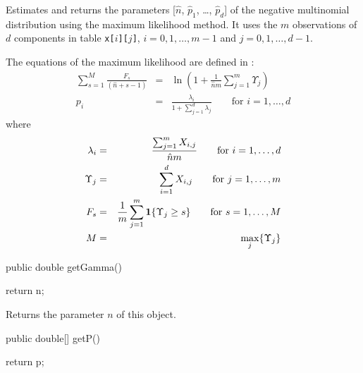 \begin{tabb}
   Estimates  and returns the parameters [$\hat{n}$, $\hat{p}_1$, \ldots,
  $\hat{p}_d$]
   of the negative multinomial distribution using the maximum likelihood method.
   It uses the $m$ observations of $d$ components in table
   \texttt{x[$i$][$j$]}, $i = 0, 1, \ldots, m-1$ and $j = 0, 1, \ldots, d-1$.
   \begin{detailed}
   The equations of the maximum likelihood are defined in \cite{tJOH69a}:
   \begin{eqnarray*}
      \sum_{s=1}^{M} \frac{F_s}{(\hat{n} + s - 1)} & = & \ln \left(1 +
        \frac{1}{\hat{n} m} \sum_{j=1}^{m} \Upsilon_j \right)\\[8pt]
      p_i & = & \frac{\lambda_i}{1 + \sum_{j=1}^{d} \lambda_j}
                 \qquad \mbox{for } i=1, \ldots,d
   \end{eqnarray*}
   where
   \begin{eqnarray*}
      \lambda_i & = & \frac{\sum_{j=1}^{m} X_{i,j}}{\hat{n} m}
             \qquad \mbox{for } i=1, \ldots,d\\
      \Upsilon_j & = & \sum_{i=1}^{d} X_{i,j} \qquad \mbox{for } j=1, \ldots,m\\
      F_s & = & \frac{1}{m} \sum_{j=1}^{m} \mbox{\textbf{1}}\{\Upsilon_j \ge s\}
        \qquad \mbox{for } s=1, \ldots,M\\
      M & = & \max_j \{\Upsilon_j\}
   \end{eqnarray*}
   \end{detailed}
\end{tabb}
\begin{htmlonly}
\end{htmlonly}
\begin{code}

   public double getGamma()\begin{hide} {
      return n;
   }\end{hide}
\end{code}
\begin{tabb}
   Returns the parameter $n$ of this object.
\end{tabb}
\begin{code}

   public double[] getP()\begin{hide} {
      return p;
   }\end{hide}
\end{code}

